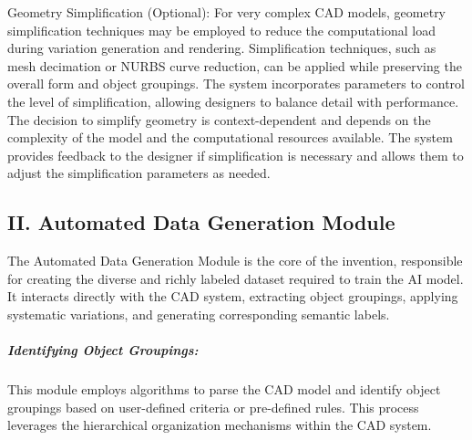 \documentclass{article}
\begin{document}
Geometry Simplification (Optional): For very complex CAD models, geometry simplification techniques may be employed to reduce the computational load during variation generation and rendering. Simplification techniques, such as mesh decimation or NURBS curve reduction, can be applied while preserving the overall form and object groupings. The system incorporates parameters to control the level of simplification, allowing designers to balance detail with performance. The decision to simplify geometry is context-dependent and depends on the complexity of the model and the computational resources available. The system provides feedback to the designer if simplification is necessary and allows them to adjust the simplification parameters as needed.

\subsection{II. Automated Data Generation Module}

The Automated Data Generation Module is the core of the invention, responsible for creating the diverse and richly labeled dataset required to train the AI model.  It interacts directly with the CAD system, extracting object groupings, applying systematic variations, and generating corresponding semantic labels.

\subparagraph{Identifying Object Groupings:} This module employs algorithms to parse the CAD model and identify object groupings based on user-defined criteria or pre-defined rules.  This process leverages the hierarchical organization mechanisms within the CAD system.
\end{document}
